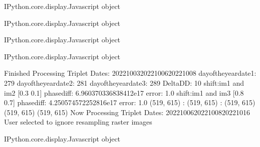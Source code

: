 \documentclass[letterpaper,10pt]{sphinxmanual}
\begin{document}
\begin{sphinxVerbatim}[commandchars=\\\{\}]
\PYGZlt{}IPython.core.display.Javascript object\PYGZgt{}
\end{sphinxVerbatim}



\begin{sphinxVerbatim}[commandchars=\\\{\}]
\PYGZlt{}IPython.core.display.Javascript object\PYGZgt{}
\end{sphinxVerbatim}



\begin{sphinxVerbatim}[commandchars=\\\{\}]
\PYGZlt{}IPython.core.display.Javascript object\PYGZgt{}
\end{sphinxVerbatim}



\begin{sphinxVerbatim}[commandchars=\\\{\}]
\PYGZlt{}IPython.core.display.Javascript object\PYGZgt{}
\end{sphinxVerbatim}



\begin{sphinxVerbatim}[commandchars=\\\{\}]
Finished Processing Triplet Dates:  20221003\PYGZhy{}20221006\PYGZhy{}20221008
day\PYGZus{}of\PYGZus{}the\PYGZus{}year\PYGZus{}date1:  279
\PYGZhy{}\PYGZhy{}\PYGZhy{}\PYGZhy{}\PYGZhy{}\PYGZhy{}\PYGZhy{}\PYGZhy{}\PYGZhy{}\PYGZhy{}\PYGZhy{}\PYGZhy{}\PYGZhy{}\PYGZhy{}\PYGZhy{}\PYGZhy{}\PYGZhy{}\PYGZhy{}\PYGZhy{}\PYGZhy{}\PYGZhy{}
day\PYGZus{}of\PYGZus{}the\PYGZus{}year\PYGZus{}date2:  281
\PYGZhy{}\PYGZhy{}\PYGZhy{}\PYGZhy{}\PYGZhy{}\PYGZhy{}\PYGZhy{}\PYGZhy{}\PYGZhy{}\PYGZhy{}\PYGZhy{}\PYGZhy{}\PYGZhy{}\PYGZhy{}\PYGZhy{}\PYGZhy{}\PYGZhy{}\PYGZhy{}\PYGZhy{}\PYGZhy{}\PYGZhy{}
day\PYGZus{}of\PYGZus{}the\PYGZus{}year\PYGZus{}date3:  289
\PYGZhy{}\PYGZhy{}\PYGZhy{}\PYGZhy{}\PYGZhy{}\PYGZhy{}\PYGZhy{}\PYGZhy{}\PYGZhy{}\PYGZhy{}\PYGZhy{}\PYGZhy{}\PYGZhy{}\PYGZhy{}\PYGZhy{}\PYGZhy{}\PYGZhy{}\PYGZhy{}\PYGZhy{}\PYGZhy{}\PYGZhy{}
Delta\PYGZus{}DD: 10
shift:im1 and im2 [\PYGZhy{}0.3 \PYGZhy{}0.1] phasediff: \PYGZhy{}6.960370336838412e\PYGZhy{}17 error: 1.0
shift:im1 and im3 [\PYGZhy{}0.8  0.7] phasediff: 4.250574572252816e\PYGZhy{}17 error: 1.0
(519, 615) :  (519, 615) :  (519, 615)
(519, 615)
(519, 615)
Now Processing Triplet Dates:  20221006\PYGZhy{}20221008\PYGZhy{}20221016
 User selected to ignore resampling raster images 



\PYGZlt{}IPython.core.display.Javascript object\PYGZgt{}
\end{sphinxVerbatim}
\end{document}
